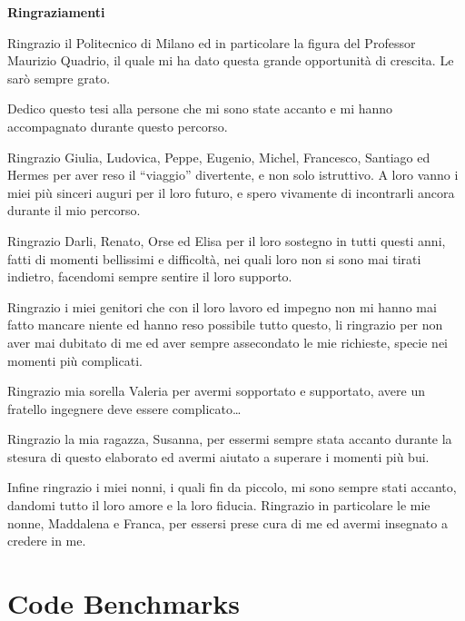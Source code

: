 \documentclass[a4paper,twosides,openright,titlepage]{book}
\newenvironment{abstract}%
	{\cleardoublepage%
		\thispagestyle{empty}%
		\null \vfill\begin{center}%
		\bfseries \abstractname \end{center}}%
	{\vfill\null}
\begin{document}
\renewcommand{\abstractname}{Ringraziamenti}
\begin{abstract}
\hrulefill

Ringrazio il Politecnico di Milano ed in particolare la figura del Professor Maurizio Quadrio, il quale mi ha dato questa grande opportunità di crescita. Le sarò sempre grato.\par
Dedico questo tesi alla persone che mi sono state accanto e mi hanno accompagnato durante questo percorso. \par
Ringrazio Giulia, Ludovica, Peppe, Eugenio, Michel, Francesco, Santiago ed Hermes per aver reso il ``viaggio'' divertente, e non solo istruttivo.
A loro vanno i miei più sinceri auguri per il loro futuro, e spero vivamente di incontrarli ancora durante il mio percorso.\par
Ringrazio Darli, Renato, Orse ed Elisa per il loro sostegno in tutti questi anni, fatti di momenti bellissimi e difficoltà, nei quali loro non si sono mai tirati indietro, facendomi sempre sentire il loro supporto.\par
Ringrazio i miei genitori che con il loro lavoro ed impegno non mi hanno mai fatto mancare niente ed hanno reso possibile tutto questo, li ringrazio per non aver mai dubitato di me ed aver sempre assecondato le mie richieste, specie nei momenti più complicati.\par
Ringrazio mia sorella Valeria per avermi sopportato e supportato, avere un fratello ingegnere deve essere complicato\dots \par
Ringrazio la mia ragazza, Susanna, per essermi sempre stata accanto durante la stesura di questo elaborato ed avermi aiutato a superare i momenti più bui.

Infine ringrazio i miei nonni, i quali fin da piccolo, mi sono sempre stati accanto, dandomi tutto il loro amore e la loro fiducia. Ringrazio in particolare le mie nonne, Maddalena e Franca, per essersi prese cura di me ed avermi insegnato a credere in me.\par
\hrulefill
\end{abstract}




\tableofcontents 
\listoffigures 
\listoftables



\mainmatter



%

\chapter{Code Benchmarks}






%



\backmatter
{} 
\printbibliography
\end{document}

